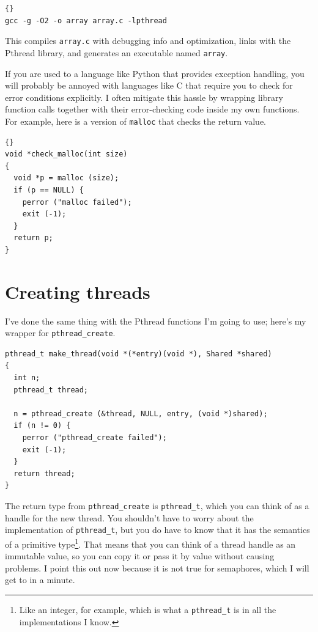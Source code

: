 \documentclass{book}
\begin{document}
\begin{latin}
\begin{lstlisting}[title={}]{}
gcc -g -O2 -o array array.c -lpthread
\end{lstlisting}
\end{latin}

This compiles {\tt array.c} with debugging info and optimization,
links with the Pthread library, and generates an executable
named {\tt array}.

If you are used to a language like Python that provides exception
handling, you will probably be annoyed with languages like C that
require you to check for error conditions explicitly.  I often
mitigate this hassle by wrapping library function calls
together with their error-checking code inside my own functions.
For example, here is a version of {\tt malloc}
that checks the return value.

\begin{latin}
\begin{lstlisting}[title={}]{}
void *check_malloc(int size)
{
  void *p = malloc (size);
  if (p == NULL) {
    perror ("malloc failed");
    exit (-1);
  }
  return p;
}
\end{lstlisting}
\end{latin}


\section{Creating threads}

I've done the same thing with the Pthread functions I'm going to use;
here's my wrapper for {\tt pthread\_create}.

\begin{latin}
\begin{lstlisting}[escapeinside={}]
pthread_t make_thread(void *(*entry)(void *), Shared *shared)
{
  int n;
  pthread_t thread;

  n = pthread_create (&thread, NULL, entry, (void *)shared);
  if (n != 0) {
    perror ("pthread_create failed");
    exit (-1);
  }
  return thread;
}
\end{lstlisting}
\end{latin}

The return type from {\tt pthread\_create} is {\tt pthread\_t},
which you can think of as a handle for the new thread.  You
shouldn't have to worry about the implementation of {\tt pthread\_t},
but you do have to know that it has the semantics of a primitive
type\footnote{Like an integer, for example, which is what a
{\tt pthread\_t} is in all the implementations I know.}.  That
means that you can think of a thread handle as an immutable
value, so you can copy it or pass it by value without causing
problems.  I point this out now because it is not true for
semaphores, which I will get to in a minute.
\end{document}
